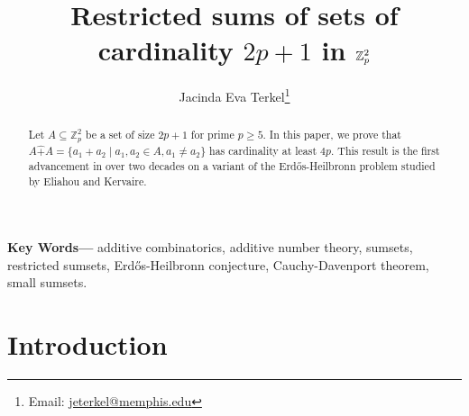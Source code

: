 \documentclass[a4paper, 12pt]{article}\usepackage[english]{babel}
\title{Restricted sums of sets of cardinality $2p+1$ in $\Z_p^2$}
\author{Jacinda Eva Terkel\thanks{Email: \href{mailto:jeterkel@memphis.edu}{jeterkel@memphis.edu}}}
\date{}
\newcommand{\Z}{\mathbb{Z}}
\newcommand{\<}{\langle}
\providecommand{\keywords}[1]{\textbf{{ Key Words---}} #1}
\begin{document}
\maketitle


\begin{abstract}
    Let $A\subseteq \Z_p^2$ be a set of size $2p+1$ for prime $p\geq 5$. In this paper, we prove that $A\hat{+}A=\{a_1+a_2\mid a_1,a_2\in A, a_1\neq a_2\}$ has cardinality at least $4p$.  This result is the first advancement in over two decades on a variant of the Erdős-Heilbronn problem studied by Eliahou and Kervaire.
\end{abstract}
\keywords{
    additive combinatorics, additive number theory, sumsets, restricted sumsets, Erdős-Heilbronn conjecture, Cauchy-Davenport theorem, small sumsets.}



\section{Introduction}
\end{document}

